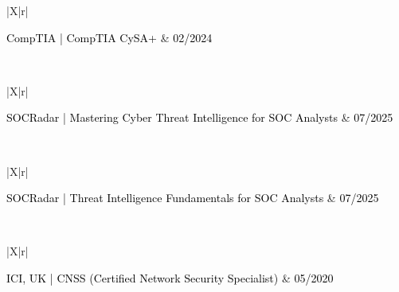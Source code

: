 \documentclass{resume}
\begin{document}
\divider \newline
\begin{tabularx}{\linewidth}{|X|r|}
    \hline
    
    \textcolor{black}{CompTIA | CompTIA CySA+} & 
    \textcolor{black}{02/2024} \\
    \hline
    
     \\
    \hline
\end{tabularx}

\divider \newline
\begin{tabularx}{\linewidth}{|X|r|}
    \hline
    
    \textcolor{black}{SOCRadar | Mastering Cyber Threat Intelligence for SOC Analysts} & 
    \textcolor{black}{07/2025} \\
    \hline
    
     \\
    \hline
\end{tabularx}

\divider \newline
\begin{tabularx}{\linewidth}{|X|r|}
    \hline
    
    \textcolor{black}{SOCRadar | Threat Intelligence Fundamentals for SOC Analysts} & 
    \textcolor{black}{07/2025} \\
    \hline
    
     \\
    \hline
\end{tabularx}

\divider \newline
\begin{tabularx}{\linewidth}{|X|r|}
    \hline
    
    \textcolor{black}{ICI, UK | CNSS (Certified Network Security Specialist)} & 
    \textcolor{black}{05/2020} \\
    \hline
    
     \\
    \hline
\end{tabularx}
\end{document}
